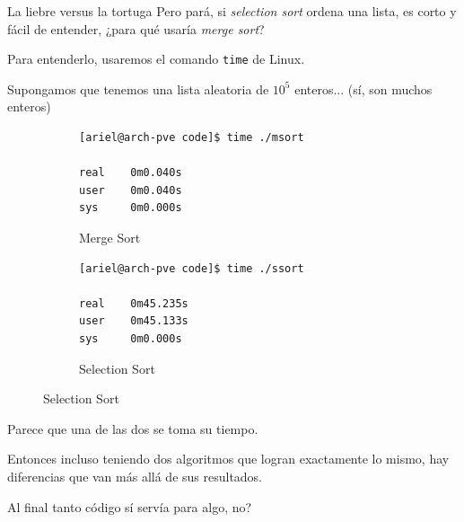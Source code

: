 \documentclass{beamer}
\begin{document}
    \begin{frame}[fragile]{La liebre versus la tortuga}
        Pero pará, si \textit{selection sort} ordena una lista, es corto y fácil de entender, ¿para qué usaría \textit{merge sort}? \pause

        Para entenderlo, usaremos el comando \texttt{time} de Linux. \pause

        Supongamos que tenemos una lista aleatoria de $10^5$ enteros... (sí, son muchos enteros) \pause

        \begin{figure}
            \begin{subfigure}[c]{.37\linewidth}
                \centering
                \begin{tcolorbox}[nobeforeafter, top=2pt, right=2pt, bottom=2pt, left=2pt]
                    \begin{verbatim}
[ariel@arch-pve code]$ time ./msort

real    0m0.040s
user    0m0.040s
sys     0m0.000s
                \end{verbatim}
                \end{tcolorbox}
                \caption{Merge Sort}
            \end{subfigure}\pause
            \quad
            \begin{subfigure}[c]{.37\linewidth}
                \centering
                \begin{tcolorbox}[nobeforeafter, top=2pt, right=2pt, bottom=2pt, left=2pt]
                    \begin{verbatim}
[ariel@arch-pve code]$ time ./ssort

real    0m45.235s
user    0m45.133s
sys     0m0.000s
                \end{verbatim}
                \end{tcolorbox}
                \caption{Selection Sort}
            \end{subfigure}
        \end{figure} \vspace{-8pt} \pause

        Parece que una de las dos se toma su tiempo. \pause 

        Entonces incluso teniendo dos algoritmos que logran exactamente lo mismo, hay diferencias que van más allá de sus resultados. 
        \pause 

        Al final tanto código sí servía para algo, no?
    \end{frame}
\end{document}

